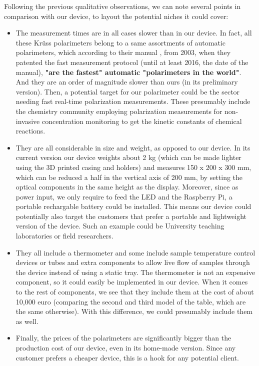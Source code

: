 \documentclass[11pt, a4paper, twoside]{article} %
\begin{document}
Following the previous qualitative observations, we can note several points in comparison with our device, to layout the potential niches it could cover:
\begin{itemize}
\item The measurement times are in all cases slower than in our device. In fact, all these Krüss polarimeters belong to a same assortments of automatic polarimeters, which according to their manual \cite{manual}, from 2003, when they patented the fast measurement protocol (until at least 2016, the date of the manual), {\bf "are the fastest" automatic "polarimeters in the world"}. And they are an order of magnitude slower than ours (in its preliminary version). Then, a potential target for our polarimeter could be the sector needing fast real-time polarization measurements. These presumably include the chemistry community employing polarization measurements for non-invasive concentration monitoring to get the kinetic constants of chemical reactions.

\item They are all considerable in size and weight, as opposed to our device. In its current version our device weights about 2 kg (which can be made lighter using the 3D printed casing and holders) and measures 150 x 200 x 300 mm, which can be reduced a half in the vertical axis of 200 mm, by setting the optical components in the same height as the display. Moreover, since as power input, we only require to feed the LED and the Raspberry Pi, a portable rechargable battery could be installed. This means our device could potentially also target the customers that prefer a portable and lightweight version of the device. Such an example could be University teaching laboratories or field researchers.


\item They all include a thermometer and some include sample temperature control devices or tubes and extra components to allow live flow of samples through the device instead of using a static tray. The thermometer is not an expensive component, so it could easily be implemented in our device. When it comes to the rest of components, we see that they include them at the cost of about 10,000 euro (comparing the second and third model of the table, which are the same otherwise). With this difference, we could presumably include them as well.

\item Finally, the prices of the polarimeters are significantly bigger than the production cost of our device, even in its home-made version. Since any customer prefers a cheaper device, this is a hook for any potential client.
\end{itemize} 
\end{document}
